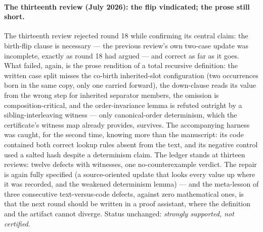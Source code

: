 \documentclass[
]{ceurart}
\theoremstyle{definition}
\begin{document}
\paragraph{The thirteenth review (July 2026): the flip vindicated; the
prose still short.}
The thirteenth review rejected round 18 while confirming its central
claim: the birth-flip clause is necessary --- the previous review's own
two-case update was incomplete, exactly as round 18 had argued --- and
correct as far as it goes.  What failed, again, is the prose rendition
of a total recursive definition: the written case split misses the
co-birth inherited-slot configuration (two occurrences born in the same
copy, only one carried forward), the down-clause reads its value from
the wrong step for inherited separator members, the omission is
composition-critical, and the order-invariance lemma is refuted outright
by a sibling-interleaving witness --- only canonical-order determinism,
which the certificate's witness map already provides, survives.  The
accompanying harness was caught, for the second time, knowing more than
the manuscript: its code contained both correct lookup rules absent
from the text, and its negative control used a salted hash despite a
determinism claim.  The ledger stands at thirteen reviews: twelve
defects with witnesses, one no-counterexample verdict.  The repair is
again fully specified (a source-oriented update that looks every value
up where it was recorded, and the weakened determinism lemma) --- and
the meta-lesson of three consecutive text-versus-code defects, against
zero mathematical ones, is that the next round should be written in a
proof assistant, where the definition and the artifact cannot diverge.
Status unchanged: \emph{strongly supported, not certified}.
\end{document}
